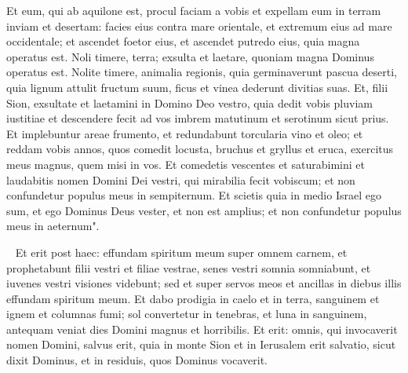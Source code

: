 \begin{biblechapter}
\verse Et eum, qui ab aquilone est, procul faciam a vobis et expellam eum in terram inviam et desertam: facies eius contra mare orientale, et extremum eius ad mare occidentale; et ascendet foetor eius, et ascendet putredo eius, quia magna operatus est. 
\verse Noli timere, terra; exsulta et laetare, quoniam magna Dominus operatus est. 
\verse Nolite timere, animalia regionis, quia germinaverunt pascua deserti, quia lignum attulit fructum suum, ficus et vinea dederunt divitias suas. 
\verse Et, filii Sion, exsultate et laetamini in Domino Deo vestro, quia dedit vobis pluviam iustitiae et descendere fecit ad vos imbrem matutinum et serotinum sicut prius. 
\verse Et implebuntur areae frumento, et redundabunt torcularia vino et oleo; 
\verse et reddam vobis annos, quos comedit locusta, bruchus et gryllus et eruca, exercitus meus magnus, quem misi in vos. 
\verse Et comedetis vescentes et saturabimini et laudabitis nomen Domini Dei vestri, qui mirabilia fecit vobiscum; et non confundetur populus meus in sempiternum. 
\verse Et scietis quia in medio Israel ego sum, et ego Dominus Deus vester, et non est amplius; et non confundetur populus meus in aeternum". 
\end{biblechapter}

\begin{biblechapter}   
\verse Et erit post haec: effundam spiritum meum super omnem carnem, et prophetabunt filii vestri et filiae vestrae, senes vestri somnia somniabunt, et iuvenes vestri visiones videbunt; 
\verse sed et super servos meos et ancillas in diebus illis effundam spiritum meum. 
\verse Et dabo prodigia in caelo et in terra, sanguinem et ignem et columnas fumi; 
\verse sol convertetur in tenebras, et luna in sanguinem, antequam veniat dies Domini magnus et horribilis. 
\verse Et erit: omnis, qui invocaverit nomen Domini, salvus erit, quia in monte Sion et in Ierusalem erit salvatio, sicut dixit Dominus, et in residuis, quos Dominus vocaverit. 
\end{biblechapter}

